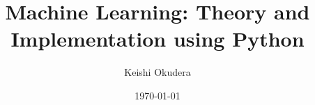 \title{Machine Learning: Theory and Implementation using Python}
\author{Keishi Okudera}
\date{\today}